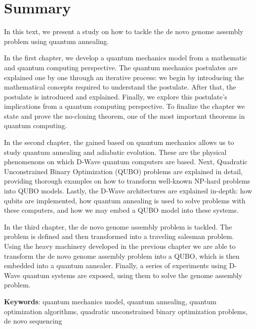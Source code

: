 \chapter*{Summary}

In this text, we present a study on how to tackle the de novo genome assembly problem using quantum annealing.

In the first chapter, we develop a quantum mechanics model from a mathematic and quantum computing perspective. The quantum mechanics postulates are explained one by one through an iterative process: we begin by introducing the mathematical concepts required to understand the postulate. After that, the postulate is introduced and explained. Finally, we explore this postulate's implications from a quantum computing perspective. To finalize the chapter we state and prove the no-cloning theorem, one of the most important theorems in quantum computing.

In the second chapter, the gained based on quantum mechanics allows us to study quantum annealing and adiabatic evolution. These are the physical phenomenons on which D-Wave quantum computers are based. Next, Quadratic Unconstrained Binary Optimization (QUBO) problems are explained in detail, providing thorough examples on how to transform well-known NP-hard problems into QUBO models. Lastly, the D-Wave architectures are explained in-depth: how qubits are implemented, how quantum annealing is used to solve problems with these computers, and how we may embed a QUBO model into these systems.

In the third chapter, the de novo genome assembly problem is tackled. The problem is defined and then transformed into a traveling salesman problem. Using the heavy machinery developed in the previous chapter we are able to transform the de novo genome assembly problem into a QUBO, which is then embedded into a quantum annealer. Finally, a series of experiments using D-Wave quantum systems are exposed, using them to solve the genome assembly problem.

\textbf{Keywords}: quantum mechanics model, quantum annealing, quantum optimization algorithms, quadratic unconstrained binary optimization problems, de novo sequencing